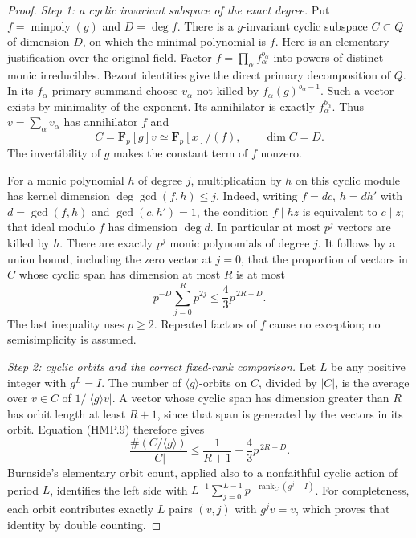 \begin{proof}
\emph{Step 1: a cyclic invariant subspace of the exact degree.}
Put $f=\operatorname{minpoly}(g)$ and $D=\deg f$.
There is a $g$-invariant cyclic subspace $C\subset Q$ of dimension
$D$, on which the minimal polynomial is $f$.
Here is an elementary justification over the original field.
Factor $f=\prod_\alpha f_\alpha^{b_\alpha}$ into powers of distinct
monic irreducibles.  Bezout identities give the direct primary
decomposition of $Q$.  In its $f_\alpha$-primary summand choose
$v_\alpha$ not killed by $f_\alpha(g)^{b_\alpha-1}$.
Such a vector exists by minimality of the exponent.
Its annihilator is exactly $f_\alpha^{b_\alpha}$.
Thus $v=\sum_\alpha v_\alpha$ has annihilator $f$ and
\[
           C=\mathbf F_p[g]v\simeq \mathbf F_p[x]/(f),
                         \qquad \dim C=D .
 \tag{HMP.8}
\]
The invertibility of $g$ makes the constant term of $f$ nonzero.

For a monic polynomial $h$ of degree $j$, multiplication by $h$
on this cyclic module has kernel dimension
$\deg\gcd(f,h)\le j$.  Indeed, writing $f=dc$, $h=dh'$ with
$d=\gcd(f,h)$ and $\gcd(c,h')=1$, the condition $f\mid hz$ is
equivalent to $c\mid z$; that ideal modulo $f$ has dimension
$\deg d$.  In particular at most $p^j$ vectors are killed by $h$.
There are exactly $p^j$ monic polynomials of degree $j$.
It follows by a union bound, including the zero vector at $j=0$,
that the proportion of vectors in $C$ whose cyclic span has
dimension at most $R$ is at most
\[
       p^{-D}\sum_{j=0}^R p^{2j}
           \le \frac43p^{\,2R-D}.
 \tag{HMP.9}
\]
The last inequality uses $p\ge2$.  Repeated factors of $f$ cause
no exception; no semisimplicity is assumed.

\emph{Step 2: cyclic orbits and the correct fixed-rank comparison.}
Let $L$ be any positive integer with $g^L=I$.
The number of $\langle g\rangle$-orbits on $C$, divided by $|C|$,
is the average over $v\in C$ of $1/|\langle g\rangle v|$.
A vector whose cyclic span has dimension greater than $R$
has orbit length at least $R+1$, since that span is generated
by the vectors in its orbit.  Equation (HMP.9) therefore gives
\[
 \frac{\#(C/\langle g\rangle)}{|C|}
       \le\frac1{R+1}+\frac43p^{\,2R-D}.
 \tag{HMP.10}
\]
Burnside's elementary orbit count, applied also to a nonfaithful
cyclic action of period $L$, identifies the left side with
$L^{-1}\sum_{j=0}^{L-1}p^{-\operatorname{rank}_C(g^j-I)}$.
For completeness, each orbit contributes exactly $L$ pairs
$(v,j)$ with $g^jv=v$, which proves that identity by double counting.


\end{proof}
